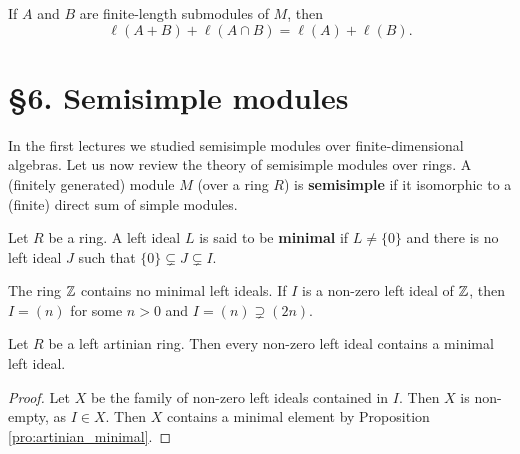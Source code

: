 
\begin{exercise}
	If $A$ and $B$ are finite-length submodules of $M$, then  
	\[
	\ell(A+B)+\ell(A\cap B)=\ell(A)+\ell(B).
	\]
\end{exercise}

\section*{\S6. Semisimple modules}

In the first lectures we studied semisimple modules over finite-dimensional 
algebras. Let us now review the theory of semisimple modules over rings. 
A (finitely generated) module $M$ (over a ring $R$) is \textbf{semisimple} 
if it isomorphic to a (finite) direct sum of simple modules. 

\begin{definition}
    Let $R$ be a ring. A left ideal $L$ is said to be \textbf{minimal}
    if $L\ne\{0\}$ and there is no left ideal $J$
    such that $\{0\}\subsetneq J\subsetneq I$.
\end{definition}

The ring $\mathbb{Z}$ contains no minimal left ideals. If $I$ is a non-zero 
left ideal of $\mathbb{Z}$, then
$I=(n)$ for some $n>0$ and $I=(n)\supsetneq (2n)$. 

\begin{proposition}
    Let $R$ be a left artinian ring. 
    Then every non-zero left ideal contains a minimal left ideal. 
\end{proposition}

\begin{proof}
    Let $X$ be the family of non-zero left ideals contained in $I$. Then $X$ is non-empty, as 
    $I\in X$. Then $X$ contains a minimal element by Proposition \ref{pro:artinian_minimal}. 
\end{proof}


